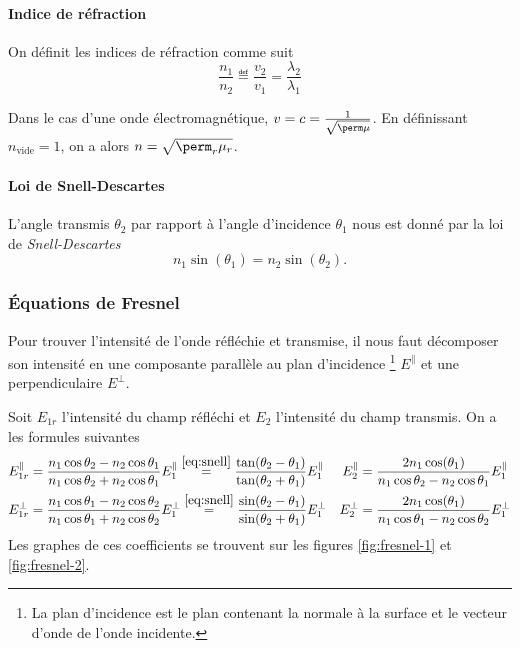\paragraph{Indice de réfraction}
On définit les indices de réfraction comme suit
\[ \frac{n_1}{n_2} \eqdef \frac{v_2}{v_1} = \frac{\lambda_2}{\lambda_1} \]

Dans le cas d'une onde électromagnétique,
$v = c = \frac{1}{\sqrt{\perm\mu}}$.
En définissant $n_\mathrm{vide} = 1$,
on a alors
$n = \sqrt{\perm_r\mu_r}$.

\paragraph{Loi de Snell-Descartes}
L'angle transmis $\theta_2$ par rapport à l'angle d'incidence
$\theta_1$ nous est donné par la loi de \emph{Snell-Descartes}
\begin{equation}
  \label{eq:snell}
  n_1 \sin(\theta_1) = n_2 \sin(\theta_2).
\end{equation}

\subsubsection{Équations de Fresnel}
Pour trouver l'intensité de l'onde réfléchie et transmise, il nous
faut décomposer son intensité en une composante parallèle au plan d'incidence
\footnote{La plan d'incidence est le plan contenant la normale à la surface
et le vecteur d'onde de l'onde incidente.}
$E^\parallel$ et une perpendiculaire $E^\perp$.

Soit $E_{1r}$ l'intensité du champ réfléchi
et $E_{2}$ l'intensité du champ transmis.
On a les formules suivantes
\begin{align*}
  E_{1r}^\parallel & = \frac{n_1\cos\theta_2 - n_2\cos\theta_1}
  {n_1\cos\theta_2 + n_2\cos\theta_1}E_{1}^\parallel
  \stackrel{\eqref{eq:snell}}{=}
  \frac{\tan(\theta_2 - \theta_1)}{\tan(\theta_2 + \theta_1)}E_1^\parallel
  & E_2^\parallel & = \frac{2n_1\cos(\theta_1)}
  {n_1\cos\theta_2 - n_2\cos\theta_1}E_{1}^\parallel\\
  E_{1r}^\perp & = \frac{n_1\cos\theta_1 - n_2\cos\theta_2}
  {n_1\cos\theta_1 + n_2\cos\theta_2}E_{1}^\perp
  \stackrel{\eqref{eq:snell}}{=}
  \frac{\sin(\theta_2 - \theta_1)}{\sin(\theta_2 + \theta_1)}E_1^\perp
  & E_2^\perp & = \frac{2n_1\cos(\theta_1)}
  {n_1\cos\theta_1 - n_2\cos\theta_2}E_{1}^\perp\\
\end{align*}
Les graphes de ces coefficients se trouvent
sur les figures \ref{fig:fresnel-1} et \ref{fig:fresnel-2}.

